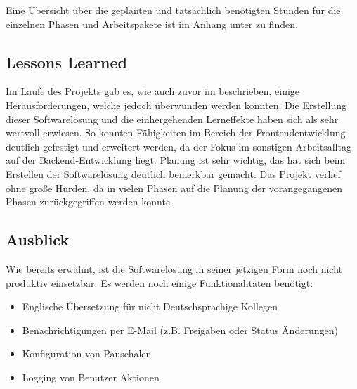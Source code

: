 Eine Übersicht über die geplanten und tatsächlich benötigten Stunden für die einzelnen Phasen und Arbeitspakete ist im Anhang unter  zu finden.

\subsection{Lessons Learned}
\label{sec:Abschlussphase:Lessons Learned}

Im Laufe des Projekts gab es, wie auch zuvor im  beschrieben, einige Herausforderungen, welche jedoch überwunden werden konnten. Die Erstellung dieser Softwarelösung und die einhergehenden Lerneffekte haben sich als sehr wertvoll erwiesen. So konnten Fähigkeiten im Bereich der Frontendentwicklung deutlich gefestigt und erweitert werden, da der Fokus im sonstigen Arbeitsalltag auf der Backend-Entwicklung liegt. Planung ist sehr wichtig, das hat sich beim Erstellen der Softwarelösung deutlich bemerkbar gemacht. Das Projekt verlief ohne große Hürden, da in vielen Phasen auf die Planung der vorangegangenen Phasen zurückgegriffen werden konnte.

\subsection{Ausblick}
\label{sec:Abschlussphase:Ausblick}
Wie bereits erwähnt, ist die Softwarelösung in seiner jetzigen Form noch nicht produktiv einsetzbar. Es werden noch einige Funktionalitäten benötigt:

\begin{itemize}
    \item Englische Übersetzung für nicht Deutschsprachige Kollegen
    \item Benachrichtigungen per E-Mail (z.B. Freigaben oder Status Änderungen)
    \item Konfiguration von Pauschalen
    \item Logging von Benutzer Aktionen
\end{itemize}
